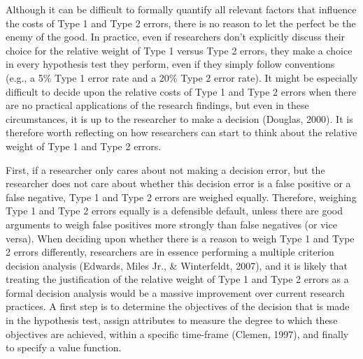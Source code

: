 \documentclass[
  english,
  ,man, a4paper,floatsintext]{apa6}
\begin{document}
Although it can be difficult to formally quantify all relevant factors that influence the costs of Type 1 and Type 2 errors, there is no reason to let the perfect be the enemy of the good. In practice, even if researchers don't explicitly discuss their choice for the relative weight of Type 1 versus Type 2 errors, they make a choice in every hypothesis test they perform, even if they simply follow conventions (e.g., a 5\% Type 1 error rate and a 20\% Type 2 error rate). It might be especially difficult to decide upon the relative costs of Type 1 and Type 2 errors when there are no practical applications of the research findings, but even in these circumstances, it is up to the researcher to make a decision (Douglas, 2000). It is therefore worth reflecting on how researchers can start to think about the relative weight of Type 1 and Type 2 errors.

First, if a researcher only cares about not making a decision error, but the researcher does not care about whether this decision error is a false positive or a false negative, Type 1 and Type 2 errors are weighed equally. Therefore, weighing Type 1 and Type 2 errors equally is a defensible default, unless there are good arguments to weigh false positives more strongly than false negatives (or vice versa). When deciding upon whether there is a reason to weigh Type 1 and Type 2 errors differently, researchers are in essence performing a multiple criterion decision analysis (Edwards, Miles Jr., \& Winterfeldt, 2007), and it is likely that treating the justification of the relative weight of Type 1 and Type 2 errors as a formal decision analysis would be a massive improvement over current research practices. A first step is to determine the objectives of the decision that is made in the hypothesis test, assign attributes to measure the degree to which these objectives are achieved, within a specific time-frame (Clemen, 1997), and finally to specify a value function.
\end{document}
